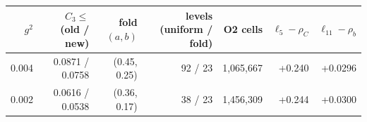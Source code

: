 \begin{tabular}{@{}rrrrrrr@{}}\toprule $g^2$&$C_3\leq$ (old / new)&fold $(a,b)$&levels (uniform / fold)&O2 cells&$\ell_5-\rho_C$&$\ell_{11}-\rho_b$\\\midrule
0.004&0.0871 / 0.0758&(0.45, 0.25)&92 / 23&1,065,667&+0.240&+0.0296\\
0.002&0.0616 / 0.0538&(0.36, 0.17)&38 / 23&1,456,309&+0.244&+0.0300\\
\bottomrule\end{tabular}

